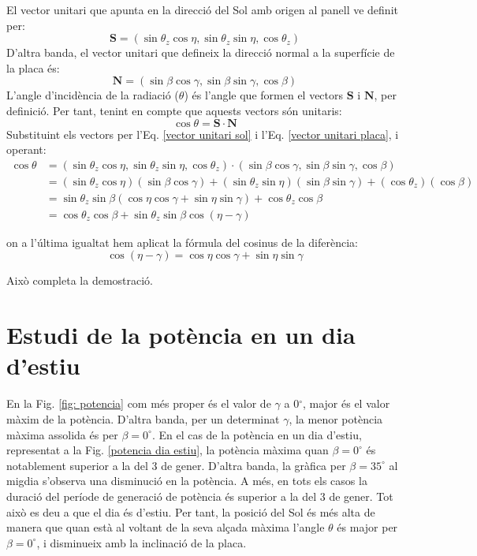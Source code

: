 \documentclass[11pt]{article}
\begin{document}
El vector unitari que apunta en la direcció del Sol amb origen al panell ve definit per:
\begin{equation}
    \mathbf{S} = (\sin \theta_z \cos \eta, \sin \theta_z \sin \eta, \cos \theta_z)
    \label{vector unitari sol}
\end{equation}
D'altra banda, el vector unitari que defineix la direcció normal a la superfície de la placa és:
\begin{equation}
       \mathbf{N} = (\sin \beta \cos \gamma, \sin \beta \sin \gamma, \cos \beta)
       \label{vector unitari placa}
\end{equation}
L'angle d'incidència de la radiació (\(\theta\)) és l'angle que formen el vectors \(\mathbf{S}\) i \(\mathbf{N}\), per definició. Per tant, tenint en compte que aquests vectors són unitaris:
\begin{equation}
    \cos \theta = \mathbf{S} \cdot \mathbf{N}
\end{equation}
Substituint els vectors per l'Eq. \eqref{vector unitari sol} i l'Eq. \eqref{vector unitari placa}, i operant:
\begin{align*}
    \cos \theta &= (\sin \theta_z \cos \eta, \sin \theta_z \sin \eta, \cos \theta_z) \cdot (\sin \beta \cos \gamma, \sin \beta \sin \gamma, \cos \beta) \\
    &= (\sin \theta_z \cos \eta)(\sin \beta \cos \gamma) + (\sin \theta_z \sin \eta)(\sin \beta \sin \gamma) + (\cos \theta_z)(\cos \beta) \\
    &= \sin \theta_z \sin \beta (\cos \eta \cos \gamma + \sin \eta \sin \gamma) + \cos \theta_z \cos \beta \\
    &= \cos \theta_z \cos \beta + \sin \theta_z \sin \beta \cos (\eta - \gamma)
\end{align*}

on a l'última igualtat hem aplicat la fórmula del cosinus de la diferència:
\[
\cos (\eta - \gamma) = \cos \eta \cos \gamma + \sin \eta \sin \gamma
\]

Això completa la demostració.


\section{Estudi de la potència en un dia d'estiu}
\label{sec: dia estiu potencia}

En la Fig. \ref{fig: potencia} com més proper és el valor de $\gamma$ a 0$^{\circ}$, major és el valor màxim de la potència. D'altra banda, per un determinat $\gamma$, la menor potència màxima assolida és per $\beta=0^{\circ}$. En el cas de la potència en un dia d'estiu, representat a la Fig. \ref{potencia dia estiu}, la potència màxima quan $\beta=0^{\circ}$ és notablement superior a la del 3 de gener. D'altra banda, la gràfica per $\beta=35^{\circ}$ al migdia s'observa una disminució en la potència. A més, en tots els casos la duració del període de generació de potència és superior a la del 3 de gener. Tot això es deu a que el dia és d'estiu. Per tant, la posició del Sol és més alta de manera que quan està al voltant de la seva alçada màxima l’angle $\theta$ és major per $\beta=0^{\circ}$, i disminueix amb la inclinació de la placa.
\end{document}
